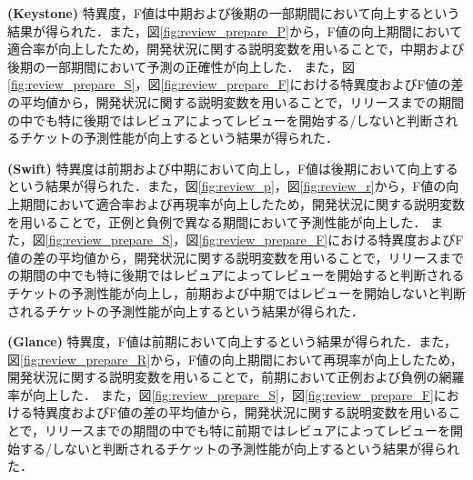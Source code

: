\documentclass[submit]{ipsj}
\begin{document}
\textbf{ (Keystone) }特異度，F値は中期および後期の一部期間において向上するという結果が得られた．また，図\ref{fig:review_prepare_P}から，F値の向上期間において適合率が向上したため，開発状況に関する説明変数を用いることで，中期および後期の一部期間において予測の正確性が向上した．
また，図\ref{fig:review_prepare_S}，図\ref{fig:review_prepare_F}における特異度およびF値の差の平均値から，開発状況に関する説明変数を用いることで，リリースまでの期間の中でも特に後期ではレビュアによってレビューを開始する/しないと判断されるチケットの予測性能が向上するという結果が得られた．

\textbf{ (Swift) }特異度は前期および中期において向上し，F値は後期において向上するという結果が得られた．また，図\ref{fig:review_p}，図\ref{fig:review_r}から，F値の向上期間において適合率および再現率が向上したため，開発状況に関する説明変数を用いることで，正例と負例で異なる期間において予測性能が向上した．
また，図\ref{fig:review_prepare_S}，図\ref{fig:review_prepare_F}における特異度およびF値の差の平均値から，開発状況に関する説明変数を用いることで，リリースまでの期間の中でも特に後期ではレビュアによってレビューを開始すると判断されるチケットの予測性能が向上し，前期および中期ではレビューを開始しないと判断されるチケットの予測性能が向上するという結果が得られた．

\textbf{ (Glance) }特異度，F値は前期において向上するという結果が得られた．また，図\ref{fig:review_prepare_R}から，F値の向上期間において再現率が向上したため，開発状況に関する説明変数を用いることで，前期において正例および負例の網羅率が向上した．
また，図\ref{fig:review_prepare_S}，図\ref{fig:review_prepare_F}における特異度およびF値の差の平均値から，開発状況に関する説明変数を用いることで，リリースまでの期間の中でも特に前期ではレビュアによってレビューを開始する/しないと判断されるチケットの予測性能が向上するという結果が得られた．
\end{document}
